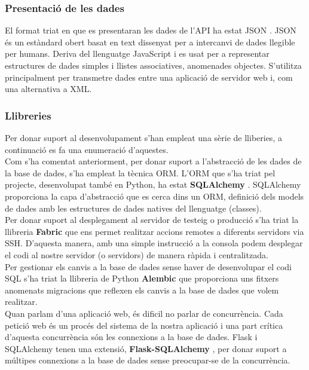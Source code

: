 	\subsubsection{Presentació de les dades}
	El format triat en que es presentaran les dades de l'\ac{API} ha estat \ac{JSON} \cite{json}. \ac{JSON} és un estàndard obert basat en text dissenyat per a intercanvi de dades llegible per humans. Deriva del llenguatge JavaScript i es usat per a representar estructures de dades simples i llistes associatives, anomenades objectes. S'utilitza principalment per transmetre dades entre una aplicació de servidor web i, com una alternativa a \ac{XML}.

	\subsubsection{Llibreries}
	Per donar suport al desenvolupament s'han empleat una sèrie de lliberies, a continuació es fa una enumeració d'aquestes.\\

	Com s'ha comentat anteriorment, per donar suport a l'abstracció de les dades de la base de dades, s'ha empleat la tècnica \ac{ORM}. L'\ac{ORM} que s'ha triat pel projecte, desenvolupat també en Python, ha estat \textbf{SQLAlchemy} \cite{sqlalchemy}. SQLAlchemy proporciona la capa d'abstracció que es cerca dins un \ac{ORM}, definició dels models de dades amb les estructures de dades natives del llenguatge (classes).\\

	Per donar suport al desplegament al servidor de testeig o producció s'ha triat la llibreria \textbf{Fabric} \cite{fabric} que ens permet realitzar accions remotes a diferents servidors via \ac{SSH}. D'aquesta manera, amb una simple instrucció a la consola podem desplegar el codi al nostre servidor (o servidors) de manera ràpida i centralitzada.\\

	Per gestionar els canvis a la base de dades sense haver de desenvolupar el codi \ac{SQL} s'ha triat la llibreria de Python \textbf{Alembic} \cite{alembic} que proporciona uns fitxers anomenats migracions que reflexen els canvis a la base de dades que volem realitzar.\\

	Quan parlam d'una aplicació web, és dificil no parlar de concurrència. Cada petició web és un procés del sistema de la nostra aplicació i una part crítica d'aquesta concurrència són les connexions a la base de dades. Flask i SQLAlchemy tenen una extensió, \textbf{Flask-SQLAlchemy} \cite{flask_sqlalchemy}, per donar suport a múltipes connexions a la base de dades sense preocupar-se de la concurrència. \\

